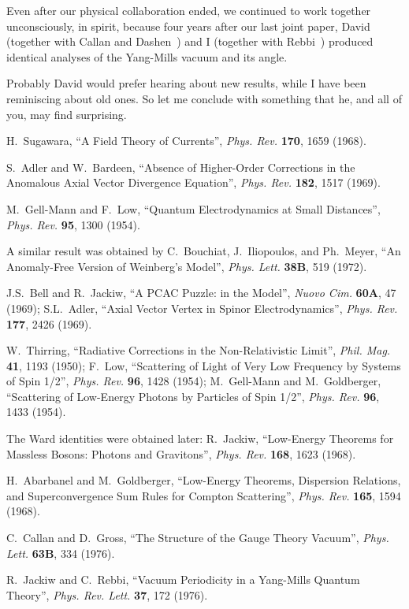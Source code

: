 \documentclass[a4paper,12pt,twoside]{article}
\def\Journal#1#2#3#4{{\em #1} {\bf #2}, #3 (#4)}
\def\PLB{Phys. Lett.} %
\def\PRL{Phys. Rev. Lett.}
\def\PR{Phys. Rev.}
\begin{document}
Even after our physical collaboration ended, we continued to work together
unconsciously, in spirit, because four years after our last joint paper, David (together
with Callan and Dashen~\cite{ref9A})  and I (together with Rebbi~\cite{ref10A})
produced identical analyses of the Yang-Mills vacuum and its angle.

Probably David would prefer hearing about new results, while I have been
reminiscing about old ones. So let me conclude with something that he, and all of you,
may find surprising.

\begin{thebibliography}{99}

 H.~Sugawara, ``A Field Theory of Currents'',
\Journal{\PR}{170}{1659}{1968}.

 S.~Adler and W.~Bardeen, ``Absence of Higher-Order Corrections
in the Anomalous Axial Vector Divergence Equation'',
\Journal{\PR}{182}{1517}{1969}.

 M.~Gell-Mann and F.~Low, ``Quantum Electrodynamics at Small
Distances'', \Journal{\PR}{95}{1300}{1954}.

 A similar result was obtained by C.~Bouchiat, J.~Iliopoulos, and
Ph.~Meyer, ``An Anomaly-Free Version of Weinberg's Model'',
\Journal{\PLB}{38B}{519}{1972}.

 J.S.~Bell and R.~Jackiw, ``A PCAC Puzzle: \myHighlight{$\pi^0 \to \gamma\gamma$}\coordHE{}
in the \myHighlight{$\sigma$}\coordHE{} Model'', \Journal{Nuovo Cim.}{60A}{47}{1969}; S.L.~Adler, ``Axial
Vector Vertex in Spinor Electrodynamics'', \Journal{\PR}{177}{2426}{1969}.

 W.~Thirring, ``Radiative Corrections in the Non-Relativistic Limit'',
\Journal{Phil. Mag.}{41}{1193}{1950}; F.~Low, ``Scattering of Light of Very Low
Frequency by Systems of Spin 1/2'', \Journal{\PR}{96}{1428}{1954}; M.~Gell-Mann
and M.~Goldberger, ``Scattering of Low-Energy Photons by Particles of Spin
1/2'', \Journal{\PR}{96}{1433}{1954}.

 The Ward identities were obtained later: R.~Jackiw,
 ``Low-Energy Theorems for Massless Bosons: Photons
and Gravitons'', \Journal{\PR}{168}{1623}{1968}. 

 H.~Abarbanel and M.~Goldberger, ``Low-Energy Theorems, Dispersion
Relations, and Superconvergence Sum Rules for Compton Scattering'',
\Journal{\PR}{165}{1594}{1968}.

 C.~Callan and D.~Gross, ``The Structure of the Gauge Theory Vacuum'',
\Journal{\PLB}{63B}{334}{1976}.

 R.~Jackiw and C.~Rebbi, ``Vacuum Periodicity in a Yang-Mills
Quantum Theory'', \Journal{\PRL}{37}{172}{1976}.

\end{thebibliography}
\end{document}
